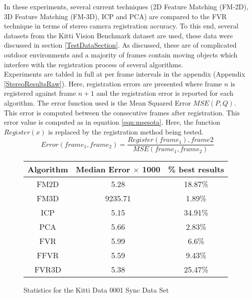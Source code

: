 	
In these experiments, several current techniques (2D Feature Matching (FM-2D), 3D Feature Matching (FM-3D), ICP and PCA) are compared to the FVR technique in terms of stereo camera registration accuracy. To this end, several datasets from the Kitti Vision Benchmark dataset are used, these data were discussed in section \ref{TestDataSection}. As discussed, these are of complicated outdoor environments and a majority of frames contain moving objects which interfere with the registration process of several algorithms. \\

Experiments are tabled in full at per frame intervals in the appendix (Appendix \ref{StereoResultsRaw}). Here, registration errors are presented where frame $n$ is registered against frame $n+1$ and the registration error is reported for each algorithm. The error function used is the Mean Squared Error $MSE(P,Q)$. This error is computed between the consecutive frames after registration. This error value is computed as in equation \ref{eqn:msesota}. Here, the function $Register(x)$ is replaced by the registration method being tested. \\

\begin{equation} \label{eqn:msesota}
Error(frame_1, frame_2) =  \frac{Register(frame_1), frame2}{MSE(frame_1,frame_2)}
\end{equation}



\begin{figure}
\centering
\begin{tabular}{ccc}
\hline
\textbf{Algorithm} & \textbf{Median Error $\times$ 1000} & \textbf{\% best results}\\ \hline
FM2D	& 5.28 & 18.87\%\\
FM3D	& 9235.71 & 1.89\%\\
ICP	& 5.15 & 34.91\%\\
PCA	& 5.66 & 2.83\%\\
FVR	& 5.99 & 6.6\%\\
FFVR	& 5.59 & 9.43\%\\
FVR3D	& 5.38 & 25.47\%\\
\end{tabular}
\caption{Statistics for the Kitti Data 0001 Sync Data Set}
\label{tab:kittidata0001sync}
\end{figure} 

